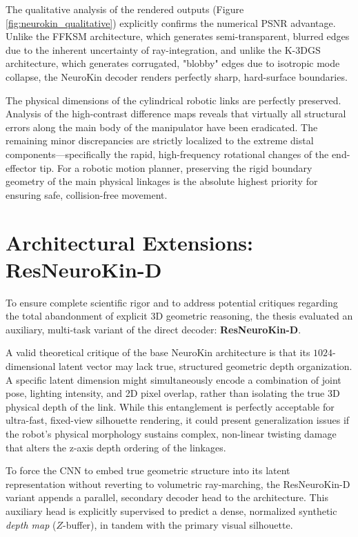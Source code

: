 \documentclass[12pt,a4paper,oneside]{report}
\begin{document}
The qualitative analysis of the rendered outputs (Figure \ref{fig:neurokin_qualitative}) explicitly confirms the numerical PSNR advantage. Unlike the FFKSM architecture, which generates semi-transparent, blurred edges due to the inherent uncertainty of ray-integration, and unlike the K-3DGS architecture, which generates corrugated, "blobby" edges due to isotropic mode collapse, the NeuroKin decoder renders perfectly sharp, hard-surface boundaries. 

The physical dimensions of the cylindrical robotic links are perfectly preserved. Analysis of the high-contrast difference maps reveals that virtually all structural errors along the main body of the manipulator have been eradicated. The remaining minor discrepancies are strictly localized to the extreme distal components—specifically the rapid, high-frequency rotational changes of the end-effector tip. For a robotic motion planner, preserving the rigid boundary geometry of the main physical linkages is the absolute highest priority for ensuring safe, collision-free movement. 

\section{Architectural Extensions: ResNeuroKin-D}

To ensure complete scientific rigor and to address potential critiques regarding the total abandonment of explicit 3D geometric reasoning, the thesis evaluated an auxiliary, multi-task variant of the direct decoder: \textbf{ResNeuroKin-D}.

A valid theoretical critique of the base NeuroKin architecture is that its $1024$-dimensional latent vector may lack true, structured geometric depth organization. A specific latent dimension might simultaneously encode a combination of joint pose, lighting intensity, and 2D pixel overlap, rather than isolating the true 3D physical depth of the link. While this entanglement is perfectly acceptable for ultra-fast, fixed-view silhouette rendering, it could present generalization issues if the robot's physical morphology sustains complex, non-linear twisting damage that alters the z-axis depth ordering of the linkages.

To force the CNN to embed true geometric structure into its latent representation without reverting to volumetric ray-marching, the ResNeuroKin-D variant appends a parallel, secondary decoder head to the architecture. This auxiliary head is explicitly supervised to predict a dense, normalized synthetic \textit{depth map} ($Z$-buffer), in tandem with the primary visual silhouette.
\end{document}
